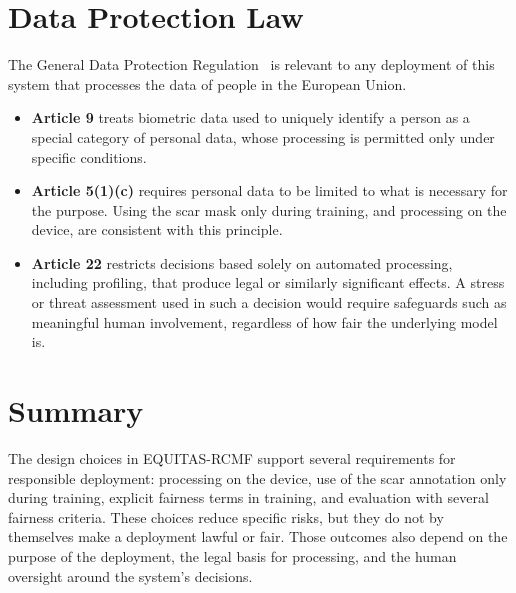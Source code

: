 \section{Data Protection Law}
The General Data Protection Regulation~\cite{gdpr2016} is relevant to any deployment of this system that processes the data of people in the European Union.
\begin{itemize}
    \item \textbf{Article 9} treats biometric data used to uniquely identify a person as a special category of personal data, whose processing is permitted only under specific conditions.
    \item \textbf{Article 5(1)(c)} requires personal data to be limited to what is necessary for the purpose. Using the scar mask only during training, and processing on the device, are consistent with this principle.
    \item \textbf{Article 22} restricts decisions based solely on automated processing, including profiling, that produce legal or similarly significant effects. A stress or threat assessment used in such a decision would require safeguards such as meaningful human involvement, regardless of how fair the underlying model is.
\end{itemize}

\section{Summary}
The design choices in EQUITAS-RCMF support several requirements for responsible deployment: processing on the device, use of the scar annotation only during training, explicit fairness terms in training, and evaluation with several fairness criteria. These choices reduce specific risks, but they do not by themselves make a deployment lawful or fair. Those outcomes also depend on the purpose of the deployment, the legal basis for processing, and the human oversight around the system's decisions.
